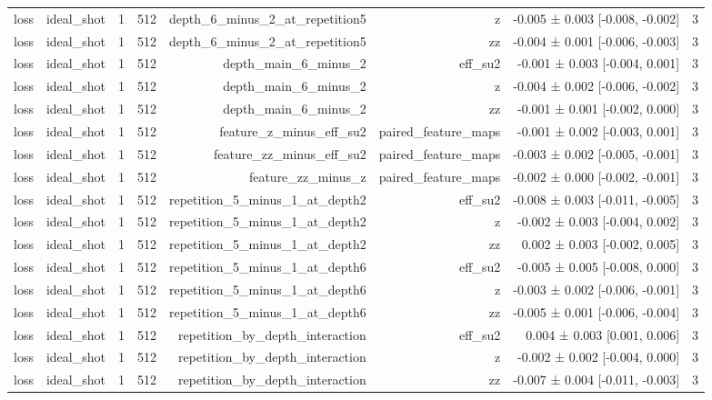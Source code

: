 \begin{table}
\begin{tabular}{lrrrrrrr}
loss & ideal\_shot & 1 & 512 & depth\_6\_minus\_2\_at\_repetition5 & z & -0.005 ± 0.003 [-0.008, -0.002] & 3 \\
loss & ideal\_shot & 1 & 512 & depth\_6\_minus\_2\_at\_repetition5 & zz & -0.004 ± 0.001 [-0.006, -0.003] & 3 \\
loss & ideal\_shot & 1 & 512 & depth\_main\_6\_minus\_2 & eff\_su2 & -0.001 ± 0.003 [-0.004, 0.001] & 3 \\
loss & ideal\_shot & 1 & 512 & depth\_main\_6\_minus\_2 & z & -0.004 ± 0.002 [-0.006, -0.002] & 3 \\
loss & ideal\_shot & 1 & 512 & depth\_main\_6\_minus\_2 & zz & -0.001 ± 0.001 [-0.002, 0.000] & 3 \\
loss & ideal\_shot & 1 & 512 & feature\_z\_minus\_eff\_su2 & paired\_feature\_maps & -0.001 ± 0.002 [-0.003, 0.001] & 3 \\
loss & ideal\_shot & 1 & 512 & feature\_zz\_minus\_eff\_su2 & paired\_feature\_maps & -0.003 ± 0.002 [-0.005, -0.001] & 3 \\
loss & ideal\_shot & 1 & 512 & feature\_zz\_minus\_z & paired\_feature\_maps & -0.002 ± 0.000 [-0.002, -0.001] & 3 \\
loss & ideal\_shot & 1 & 512 & repetition\_5\_minus\_1\_at\_depth2 & eff\_su2 & -0.008 ± 0.003 [-0.011, -0.005] & 3 \\
loss & ideal\_shot & 1 & 512 & repetition\_5\_minus\_1\_at\_depth2 & z & -0.002 ± 0.003 [-0.004, 0.002] & 3 \\
loss & ideal\_shot & 1 & 512 & repetition\_5\_minus\_1\_at\_depth2 & zz & 0.002 ± 0.003 [-0.002, 0.005] & 3 \\
loss & ideal\_shot & 1 & 512 & repetition\_5\_minus\_1\_at\_depth6 & eff\_su2 & -0.005 ± 0.005 [-0.008, 0.000] & 3 \\
loss & ideal\_shot & 1 & 512 & repetition\_5\_minus\_1\_at\_depth6 & z & -0.003 ± 0.002 [-0.006, -0.001] & 3 \\
loss & ideal\_shot & 1 & 512 & repetition\_5\_minus\_1\_at\_depth6 & zz & -0.005 ± 0.001 [-0.006, -0.004] & 3 \\
loss & ideal\_shot & 1 & 512 & repetition\_by\_depth\_interaction & eff\_su2 & 0.004 ± 0.003 [0.001, 0.006] & 3 \\
loss & ideal\_shot & 1 & 512 & repetition\_by\_depth\_interaction & z & -0.002 ± 0.002 [-0.004, 0.000] & 3 \\
loss & ideal\_shot & 1 & 512 & repetition\_by\_depth\_interaction & zz & -0.007 ± 0.004 [-0.011, -0.003] & 3 \\

\end{tabular}
\end{table}
